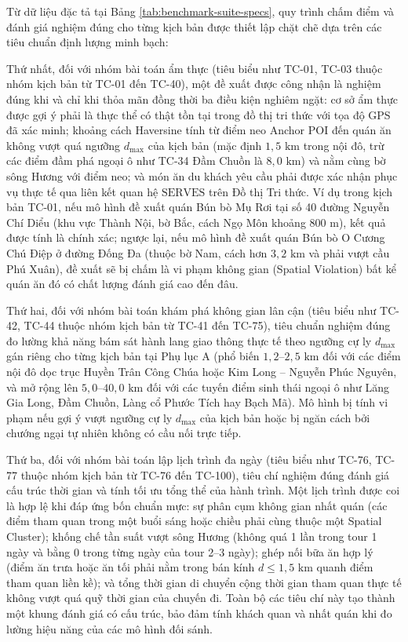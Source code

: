 Từ dữ liệu đặc tả tại Bảng \ref{tab:benchmark-suite-specs}, quy trình chấm điểm và đánh giá nghiệm đúng cho từng kịch bản được thiết lập chặt chẽ dựa trên các tiêu chuẩn định lượng minh bạch:

Thứ nhất, đối với nhóm bài toán ẩm thực (tiêu biểu như TC-01, TC-03 thuộc nhóm kịch bản từ TC-01 đến TC-40), một đề xuất được công nhận là nghiệm đúng khi và chỉ khi thỏa mãn đồng thời ba điều kiện nghiêm ngặt: cơ sở ẩm thực được gợi ý phải là thực thể có thật tồn tại trong đồ thị tri thức với tọa độ GPS đã xác minh; khoảng cách Haversine tính từ điểm neo Anchor POI đến quán ăn không vượt quá ngưỡng $d_{\max}$ của kịch bản (mặc định $1{,}5\text{ km}$ trong nội đô, trừ các điểm đầm phá ngoại ô như TC-34 Đầm Chuồn là $8{,}0\text{ km}$) và nằm cùng bờ sông Hương với điểm neo; và món ăn du khách yêu cầu phải được xác nhận phục vụ thực tế qua liên kết quan hệ $\text{SERVES}$ trên Đồ thị Tri thức. Ví dụ trong kịch bản TC-01, nếu mô hình đề xuất quán Bún bò Mụ Rơi tại số 40 đường Nguyễn Chí Diểu (khu vực Thành Nội, bờ Bắc, cách Ngọ Môn khoảng $800\text{ m}$), kết quả được tính là chính xác; ngược lại, nếu mô hình đề xuất quán Bún bò O Cương Chú Điệp ở đường Đống Đa (thuộc bờ Nam, cách hơn $3{,}2\text{ km}$ và phải vượt cầu Phú Xuân), đề xuất sẽ bị chấm là vi phạm không gian (Spatial Violation) bất kể quán ăn đó có chất lượng đánh giá cao đến đâu.

Thứ hai, đối với nhóm bài toán khám phá không gian lân cận (tiêu biểu như TC-42, TC-44 thuộc nhóm kịch bản từ TC-41 đến TC-75), tiêu chuẩn nghiệm đúng đo lường khả năng bám sát hành lang giao thông thực tế theo ngưỡng cự ly $d_{\max}$ gán riêng cho từng kịch bản tại Phụ lục A (phổ biến $1{,}2\text{--}2{,}5\text{ km}$ đối với các điểm nội đô dọc trục Huyền Trân Công Chúa hoặc Kim Long -- Nguyễn Phúc Nguyên, và mở rộng lên $5{,}0\text{--}40{,}0\text{ km}$ đối với các tuyến điểm sinh thái ngoại ô như Lăng Gia Long, Đầm Chuồn, Làng cổ Phước Tích hay Bạch Mã). Mô hình bị tính vi phạm nếu gợi ý vượt ngưỡng cự ly $d_{\max}$ của kịch bản hoặc bị ngăn cách bởi chướng ngại tự nhiên không có cầu nối trực tiếp.

Thứ ba, đối với nhóm bài toán lập lịch trình đa ngày (tiêu biểu như TC-76, TC-77 thuộc nhóm kịch bản từ TC-76 đến TC-100), tiêu chí nghiệm đúng đánh giá cấu trúc thời gian và tính tối ưu tổng thể của hành trình. Một lịch trình được coi là hợp lệ khi đáp ứng bốn chuẩn mực: sự phân cụm không gian nhất quán (các điểm tham quan trong một buổi sáng hoặc chiều phải cùng thuộc một Spatial Cluster); khống chế tần suất vượt sông Hương (không quá 1 lần trong tour 1 ngày và bằng 0 trong từng ngày của tour 2--3 ngày); ghép nối bữa ăn hợp lý (điểm ăn trưa hoặc ăn tối phải nằm trong bán kính $d \le 1{,}5\text{ km}$ quanh điểm tham quan liền kề); và tổng thời gian di chuyển cộng thời gian tham quan thực tế không vượt quá quỹ thời gian của chuyến đi. Toàn bộ các tiêu chí này tạo thành một khung đánh giá có cấu trúc, bảo đảm tính khách quan và nhất quán khi đo lường hiệu năng của các mô hình đối sánh.

